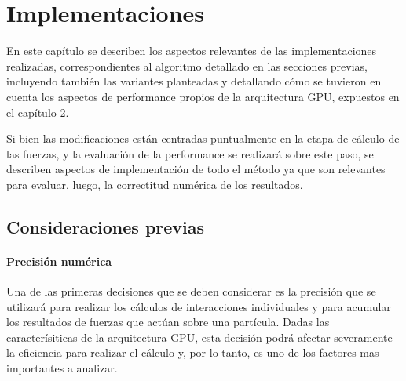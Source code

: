 \chapter{Implementaciones}

En este capítulo se describen los aspectos relevantes de las implementaciones realizadas, correspondientes al algoritmo detallado en las secciones previas, incluyendo también las variantes planteadas y
detallando cómo se tuvieron en cuenta los aspectos de performance propios de la arquitectura GPU, expuestos en el capítulo 2.

Si bien las modificaciones están centradas puntualmente en la etapa de cálculo de las fuerzas, y la evaluación de la performance se realizará sobre este paso,
se describen aspectos de implementación de todo el método ya que son relevantes para evaluar, luego, la correctitud numérica de los resultados.



\section{Consideraciones previas}

\subsubsection{Precisión numérica}

Una de las primeras decisiones que se deben considerar es la precisión que se utilizará para realizar los cálculos de interacciones individuales y para acumular los resultados de fuerzas que actúan sobre una partícula. 
Dadas las caracterísiticas de la arquitectura GPU, esta decisión podrá afectar severamente la eficiencia para realizar el cálculo y, por lo tanto, es uno de los factores mas importantes a analizar.

